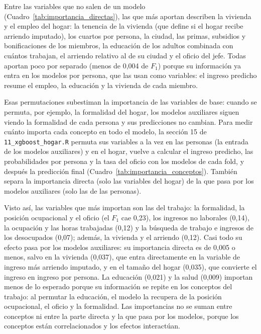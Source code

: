 \documentclass[12pt]{article}
\begin{document}


Entre las variables que no salen de un modelo (Cuadro~\ref{tab:importancia_directas}),
las que más aportan describen la vivienda y el empleo del hogar: la tenencia
de la vivienda (que define si el hogar recibe arriendo imputado), los cuartos
por persona, la ciudad, las primas, subsidios y bonificaciones de los
miembros, la educación de los adultos combinada con cuántos trabajan, el
arriendo relativo al de su ciudad y el oficio del jefe. Todas aportan poco
por separado (menos de 0,004 de $F_1$) porque su información ya entra en los
modelos por persona, que las usan como variables: el ingreso predicho resume
el empleo, la educación y la vivienda de cada miembro.

Esas permutaciones subestiman la importancia de las variables de base:
cuando se permuta, por ejemplo, la formalidad del hogar, los modelos
auxiliares siguen viendo la formalidad de cada persona y sus predicciones no
cambian. Para medir cuánto importa cada concepto en todo el modelo, la
sección 15 de \texttt{11\_xgboost\_hogar.R} permuta sus variables a la vez
en las personas (la entrada de los modelos auxiliares) y en el hogar, vuelve
a calcular el ingreso predicho, las probabilidades por persona y la tasa del
oficio con los modelos de cada fold, y después la predicción final
(Cuadro~\ref{tab:importancia_conceptos}). También separa la importancia
directa (solo las variables del hogar) de la que pasa por los modelos
auxiliares (solo las de las personas).



Visto así, las variables que más importan son las del trabajo: la
formalidad, la posición ocupacional y el oficio (el $F_1$ cae 0,23), los
ingresos no laborales (0,14), la ocupación y las horas trabajadas (0,12) y la
búsqueda de trabajo e ingresos de los desocupados (0,07); además, la vivienda
y el arriendo (0,12). Casi todo su efecto pasa por los modelos auxiliares:
su importancia directa es de 0,005 o menos, salvo en la vivienda (0,037),
que entra directamente en la variable de ingreso más arriendo imputado, y en
el tamaño del hogar (0,035), que convierte el ingreso en ingreso por persona.
La educación (0,021) y la salud (0,009) importan menos de lo esperado porque
su información se repite en los conceptos del trabajo: al permutar la
educación, el modelo la recupera de la posición ocupacional, el oficio y la
formalidad. Las importancias no se suman entre conceptos ni entre la parte
directa y la que pasa por los modelos, porque los conceptos están
correlacionados y los efectos interactúan.
\end{document}
